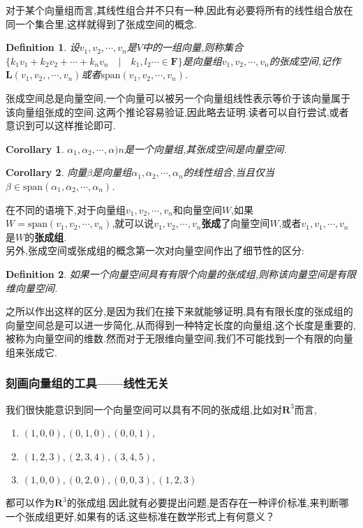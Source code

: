 \documentclass{ctexart}
\newtheorem{corollary}{Corollary}
\newtheorem{definition}{Definition}
\begin{document}
\noindent 对于某个向量组而言,其线性组合并不只有一种,因此有必要将所有的线性组合放在同一个集合里,这样就得到了张成空间的概念.

\begin{definition}
    设$v_1,v_2,\cdots,v_n$是$V$中的一组向量,则称集合$\{k_1v_1+k_2v_2+\cdots+k_nv_n \quad| \quad k_1,l_2\cdots \in \mathbf{F}\}$是向量组$v_1,v_2,\cdots,v_n$的张成空间,记作$\mathbf{L}(v_1,v_2,,\cdots,v_n)$或者$\mbox{span}(v_1,v_2,\cdots,v_n)$.\\
\end{definition}

\noindent 张成空间总是向量空间,一个向量可以被另一个向量组线性表示等价于该向量属于该向量组张成的空间.这两个推论容易验证,因此略去证明.读者可以自行尝试,或者意识到可以这样推论即可.

\begin{corollary}
    $\alpha_1,\alpha_2,\cdots,\alpha)n$是一个向量组,其张成空间是向量空间.
\end{corollary}

\begin{corollary}
    向量$\beta$是向量组$\alpha_1,\alpha_2,\cdots,\alpha_n$的线性组合,当且仅当$\beta \in \mbox{span}(\alpha_1,\alpha_2,\cdots,\alpha_n)$.\\
\end{corollary}

\noindent 在不同的语境下,对于向量组$v_1,v_2,\cdots,v_n$和向量空间$W$,如果$W=\mbox{span}(v_1,v_2,\cdots,v_n)$,就可以说$v_1,v_2,\cdots,v_n$\textbf{张成}了向量空间$W$,或者$v_1,v_1,\cdots,v_n$是$W$的\textbf{张成组}.\\

\noindent 另外,张成空间或张成组的概念第一次对向量空间作出了细节性的区分:

\begin{definition}
    如果一个向量空间具有有限个向量的张成组,则称该向量空间是有限维向量空间.
\end{definition}

\noindent 之所以作出这样的区分,是因为我们在接下来就能够证明,具有有限长度的张成组的向量空间总是可以进一步简化,从而得到一种特定长度的向量组,这个长度是重要的,被称为向量空间的维数.然而对于无限维向量空间,我们不可能找到一个有限的向量组来张成它.\\


\subsubsection{刻画向量组的工具——线性无关}

\noindent 我们很快能意识到同一个向量空间可以具有不同的张成组,比如对$\mathbf{R}^3$而言,
\begin{enumerate}
    \item $(1,0,0),(0,1,0),(0,0,1)$,
    \item $(1,2,3),(2,3,4),(3,4,5)$,
    \item $(1,0,0),(0,2,0),(0,0,3),(1,2,3)$
\end{enumerate}
都可以作为$\mathbf{R}^3$的张成组.因此就有必要提出问题,是否存在一种评价标准,来判断哪一个张成组更好,如果有的话,这些标准在数学形式上有何意义？\\
\end{document}
